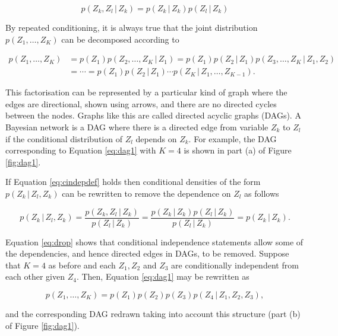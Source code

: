 \documentclass[11pt,]{book}
\begin{document}
\begin{equation}
p(Z_k, Z_l \, | \, Z_k) = p(Z_k \, | \, Z_k)p(Z_l \, | \, Z_k) \label{eq:cindepdef}
\end{equation}

By repeated conditioning, it is always true that the joint distribution
\(p(Z_1, \ldots, Z_K)\) can be decomposed according to

\begin{align}
p(Z_1, \ldots, Z_K) &= p(Z_1)p(Z_2, \ldots, Z_K \, | \, Z_1) = p(Z_1) p(Z_2 \, | \, Z_1) p(Z_3, \ldots, Z_K \, | \, Z_1, Z_2) \nonumber \\
&= \cdots = p(Z_1) p(Z_2 \, | \, Z_1) \cdots p(Z_K \, | \, Z_1, \ldots, Z_{K-1}). \label{eq:dag1}
\end{align}

This factorisation can be represented by a particular kind of graph
where the edges are directional, shown using arrows, and there are no
directed cycles between the nodes. Graphs like this are called directed
acyclic graphs (DAGs). A Bayesian network is a DAG where there is a
directed edge from variable \(Z_k\) to \(Z_l\) if the conditional
distribution of \(Z_l\) depends on \(Z_k\). For example, the DAG
corresponding to Equation \eqref{eq:dag1} with \(K = 4\) is shown in
part (a) of Figure \ref{fig:dag1}.

If Equation \eqref{eq:cindepdef} holds then conditional densities of the
form \(p(Z_k \, | \, Z_l, Z_k)\) can be rewritten to remove the
dependence on \(Z_l\) as follows

\begin{equation}
p(Z_k \, | \, Z_l, Z_k) = \frac{p(Z_k, Z_l \, | \, Z_k)}{p(Z_l \, | \, Z_k)} 
= \frac{p(Z_k \, | \, Z_k)p(Z_l \, | \, Z_k)}{p(Z_l \, | \, Z_k)}
= p(Z_k \, | \, Z_k). \label{eq:drop}
\end{equation}

Equation \eqref{eq:drop} shows that conditional independence statements
allow some of the dependencies, and hence directed edges in DAGs, to be
removed. Suppose that \(K = 4\) as before and each \(Z_1, Z_2\) and
\(Z_3\) are conditionally independent from each other given \(Z_4\).
Then, Equation \eqref{eq:dag1} may be rewritten as

\begin{equation}
p(Z_1, \ldots, Z_K) = p(Z_1)p(Z_2)p(Z_3)p(Z_4 \, | \, Z_1, Z_2, Z_3),  \label{eq:dag2}
\end{equation}

and the corresponding DAG redrawn taking into account this structure
(part (b) of Figure \ref{fig:dag1}).
\end{document}
